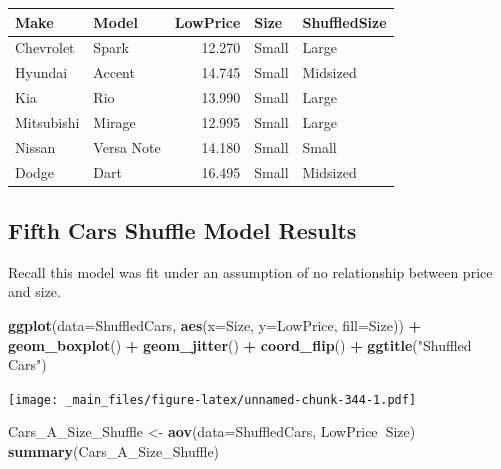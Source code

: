 \documentclass[]{book}
\newenvironment{Shaded}{\begin{snugshade}}{\end{snugshade}}
\newcommand{\KeywordTok}[1]{\textcolor[rgb]{0.13,0.29,0.53}{\textbf{#1}}}
\newcommand{\DataTypeTok}[1]{\textcolor[rgb]{0.13,0.29,0.53}{#1}}
\newcommand{\StringTok}[1]{\textcolor[rgb]{0.31,0.60,0.02}{#1}}
\newcommand{\OperatorTok}[1]{\textcolor[rgb]{0.81,0.36,0.00}{\textbf{#1}}}
\newcommand{\NormalTok}[1]{#1}
\begin{document}
\begin{tabular}{l|l|r|l|l}
\hline
Make & Model & LowPrice & Size & ShuffledSize\\
\hline
Chevrolet & Spark & 12.270 & Small & Large\\
\hline
Hyundai & Accent & 14.745 & Small & Midsized\\
\hline
Kia & Rio & 13.990 & Small & Large\\
\hline
Mitsubishi & Mirage & 12.995 & Small & Large\\
\hline
Nissan & Versa Note & 14.180 & Small & Small\\
\hline
Dodge & Dart & 16.495 & Small & Midsized\\
\hline
\end{tabular}

\subsection{Fifth Cars Shuffle Model
Results}\label{fifth-cars-shuffle-model-results-1}

Recall this model was fit under an assumption of no relationship between
price and size.

\begin{Shaded}
\begin{Highlighting}[]
\KeywordTok{ggplot}\NormalTok{(}\DataTypeTok{data=}\NormalTok{ShuffledCars, }\KeywordTok{aes}\NormalTok{(}\DataTypeTok{x=}\NormalTok{Size, }\DataTypeTok{y=}\NormalTok{LowPrice, }\DataTypeTok{fill=}\NormalTok{Size)) }\OperatorTok{+}\StringTok{ }
\StringTok{  }\KeywordTok{geom_boxplot}\NormalTok{() }\OperatorTok{+}\StringTok{ }\KeywordTok{geom_jitter}\NormalTok{() }\OperatorTok{+}\StringTok{ }\KeywordTok{coord_flip}\NormalTok{() }\OperatorTok{+}\StringTok{ }\KeywordTok{ggtitle}\NormalTok{(}\StringTok{"Shuffled Cars"}\NormalTok{)}
\end{Highlighting}
\end{Shaded}

\texttt{[image: \_main\_files/figure-latex/unnamed-chunk-344-1.pdf]}

\begin{Shaded}
\begin{Highlighting}[]
\NormalTok{Cars_A_Size_Shuffle <-}\StringTok{ }\KeywordTok{aov}\NormalTok{(}\DataTypeTok{data=}\NormalTok{ShuffledCars, LowPrice}\OperatorTok{~}\NormalTok{Size)}
\KeywordTok{summary}\NormalTok{(Cars_A_Size_Shuffle)}
\end{Highlighting}
\end{Shaded}
\end{document}
